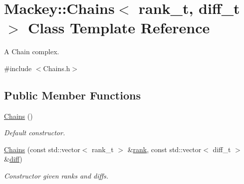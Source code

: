 \hypertarget{classMackey_1_1Chains}{}\section{Mackey\+:\+:Chains$<$ rank\+\_\+t, diff\+\_\+t $>$ Class Template Reference}
\label{classMackey_1_1Chains}


A Chain complex.  




{\ttfamily \#include $<$Chains.\+h$>$}

\subsection*{Public Member Functions}
\begin{DoxyCompactItemize}
\item 
\hyperlink{classMackey_1_1Chains_ade226a800be59b53f1f1850e0753dbcb}{Chains} ()
\begin{DoxyCompactList}\small\item\em Default constructor. \end{DoxyCompactList}\item 
\hyperlink{classMackey_1_1Chains_a23e36ad0f810adeecad83b87b7034335}{Chains} (const std\+::vector$<$ rank\+\_\+t $>$ \&\hyperlink{classMackey_1_1Chains_ad041dff6f210ae5be4de0a3b076a4d95}{rank}, const std\+::vector$<$ diff\+\_\+t $>$ \&\hyperlink{classMackey_1_1Chains_a9ccee2cbb3daa1e82bab920aeef59516}{diff})
\begin{DoxyCompactList}\small\item\em Constructor given ranks and diffs. \end{DoxyCompactList}\end{DoxyCompactItemize}
